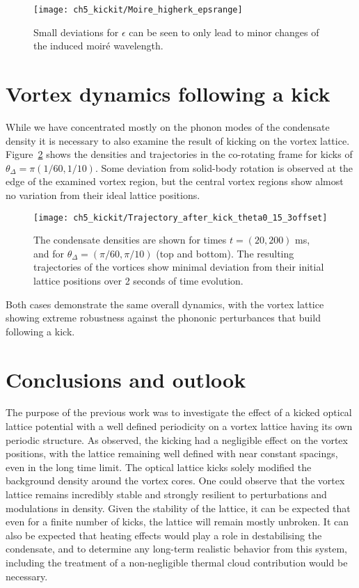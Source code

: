     \begin{figure}
        \centering
        \texttt{[image: ch5\_kickit/Moire\_higherk\_epsrange]}
    	\caption[Moir\'e wavelengths for imperfect lattice alignment.]{Small deviations for $\epsilon$ can be seen to only lead to minor changes of the induced moir\'e wavelength.}\label{fig:epsilon}
    \end{figure}

\section{Vortex dynamics following a kick}\label{sec:moire_dyn_lattice}
While we have concentrated mostly on the phonon modes of the condensate density it is necessary to also examine the result of kicking on the vortex lattice. Figure~\ref{fig:kickit_traj} shows the densities and trajectories in the co-rotating frame for kicks of $\theta_{\Delta}=\pi (1/60, 1/10)$. Some deviation from solid-body rotation is observed at the edge of the examined vortex region, but the central vortex regions show almost no variation from their ideal lattice positions.
\begin{figure}
    \centering
    \texttt{[image: ch5\_kickit/Trajectory\_after\_kick\_theta0\_15\_3offset]}
	\caption[Vortex densities and trajectories following a kick.]{The condensate densities are shown for times $t=(20,200)$ ms, and for $\theta_\Delta = (\pi/60,\pi/10)$ (top and bottom). The resulting trajectories of the vortices show minimal deviation from their initial lattice positions over 2 seconds of time evolution.}\label{fig:kickit_traj}
\end{figure}
Both cases demonstrate the same overall dynamics, with the vortex lattice showing extreme robustness against the phononic perturbances that build following a kick.

\section{Conclusions and outlook}\label{sec:ch5_conc}
The purpose of the previous work was to investigate the effect of a kicked optical lattice potential with a well defined periodicity on a vortex lattice having its own periodic structure. As observed, the kicking had a negligible effect on the vortex positions, with the lattice remaining well defined with near constant spacings, even in the long time limit. The optical lattice kicks solely modified the background density around the vortex cores. One could observe that the vortex lattice remains incredibly stable and strongly resilient to perturbations and modulations in density. Given the stability of the lattice, it can be expected that even for a finite number of kicks, the lattice will remain mostly unbroken. It can also be expected that heating effects would play a role in destabilising the condensate, and to determine any long-term realistic behavior from this system, including the treatment of a non-negligible thermal cloud contribution would be necessary.

